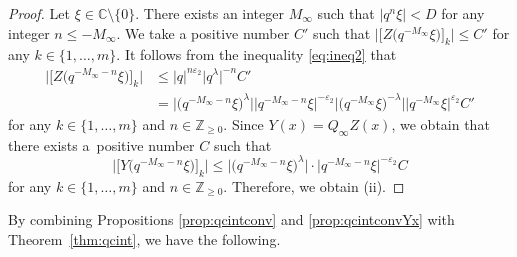 \documentclass[pdftex]{sigma}
\numberwithin{equation}{section}
\theoremstyle{definition}
\begin{document}
\begin{proof}
Let $\xi \in \mathbb{C} \setminus \{0\} $.
There exists an integer $M_{\infty }$ such that $| q^n \xi | < D $ for any integer $n \leq -M_{\infty }$.
We take a positive number $C' $ such that $\big| \big[Z\bigl( q^{-M_{\infty }} \xi \bigr)\big]_k\big| \leq C' $ for any $k \in \{1, \dots ,m \}$.
It follows from the inequality \eqref{eq:ineq2} that
\begin{align*}
\big| \big[Z\bigl( q^{-M_{\infty } -n} \xi \bigr)\big]_k\big| &\leq |q | ^{n \varepsilon _2} \big|q ^{\lambda }\big|^{-n} C'\\
& = \big|\bigl(q^{-M_{\infty } -n } \xi \bigr)^{\lambda } \big| \big|q^{-M_{\infty } -n} \xi \big|^{ - \varepsilon _2 }
  \big|\bigl(q^{-M_{\infty } } \xi \bigr)^{- \lambda } \big| \big|q^{-M_{\infty } } \xi \big|^{ \varepsilon _2 } C' \end{align*}
 for any $k \in \{1, \dots ,m \}$ and $n \in \mathbb{Z} _{\geq 0}$.
Since $Y (x) = Q_{\infty } Z(x)$, we obtain that there exists a~positive number $C$ such that
\[
\big| \big[Y\bigl( q^{-M_{\infty } -n} \xi \bigr)\big]_k\big| \leq \big|\bigl(q^{-M_{\infty } -n } \xi \bigr)^{\lambda } \big|
\cdot \big|q^{-M_{\infty } -n} \xi \big|^{ - \varepsilon _2 } C
\]
 for any $k \in \{1, \dots ,m \}$ and $n \in \mathbb{Z} _{\geq 0}$.
Therefore, we obtain (ii).
\end{proof}

By combining Propositions \ref{prop:qcintconv} and \ref{prop:qcintconvYx} with Theorem~\ref{thm:qcint}, we have the following.
\end{document}
